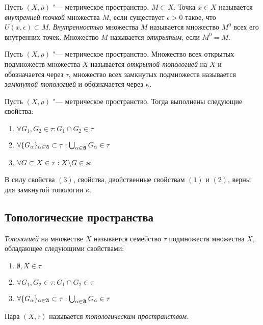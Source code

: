 \begin{definition}
	Пусть $(X, \rho)$ "--- метрическое пространство, $M \subset X$. Точка $x \in X$ называется \textit{внутренней точкой} множества $M$, если существует $\epsilon > 0$ такое, что $U(x, \epsilon) \subset M$. \textit{Внутренностью} множества $M$ называется множество $M^0$ всех его внутренних точек. Множество $M$ называется \textit{открытым}, если $M^0 = M$.
\end{definition}

\begin{definition}
	Пусть $(X, \rho)$ "--- метрическое пространство. Множество всех открытых подмножеств множества $X$ называется \textit{открытой топологией} на $X$ и обозначается через $\tau$, множество всех замкнутых подмножеств называется \textit{замкнутой топологией} и обозначается через $\kappa$.
\end{definition}

\begin{note}
	Пусть $(X, \rho)$ "--- метрическое пространство. Тогда выполнены следующие свойства:
	\begin{enumerate}
		\item $\forall G_1, G_2 \in \tau: G_1 \cap G_2 \in \tau$
		\item $\forall \{G_\alpha\}_{\alpha \in \mathfrak A} \subset \tau: \bigcup_{\alpha \in \mathfrak A}G_\alpha \in \tau$
		\item $\forall G \subset X \in \tau: X \backslash G \in \varkappa$
	\end{enumerate}
	
	В силу свойства $(3)$, свойства, двойственные свойствам $(1)$ и $(2)$, верны для замкнутой топологии $\kappa$.
\end{note}

\subsection{Топологические пространства}

\begin{definition}
	\textit{Топологией} на множестве $X$ называется семейство $\tau$ подмножеств множества $X$, обладающее следующими свойствами:
	\begin{enumerate}
		\item $\emptyset, X \in \tau$
		\item $\forall G_1, G_2 \in \tau: G_1 \cap G_2 \in \tau$
		\item $\forall \{G_\alpha\}_{\alpha \in \mathfrak A} \subset \tau: \bigcup_{\alpha \in \mathfrak A}G_\alpha\in \tau$
	\end{enumerate}
	
	Пара $(X, \tau)$ называется \textit{топологическим пространством}.
\end{definition}

